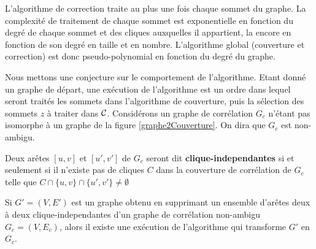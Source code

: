 L'algorithme de correction traite au plus une fois chaque sommet du graphe.
La complexit\'e de traitement de chaque sommet est exponentielle en fonction du degr\'e de chaque sommet et des cliques auxquelles il appartient, la encore en fonction  de son degr\'e en taille et en nombre.
L'algorithme global (couverture et correction) est donc pseudo-polynomial en fonction du degr\'e du graphe.
\newline

Nous mettons une conjecture sur le comportement de l'algorithme.
Etant donn\'e un graphe de d\'epart, une ex\'ecution de l'algorithme est un ordre dans lequel seront trait\'es les sommets dans l'algorithme de couverture, puis
la s\'election des sommets $z$ \`a traiter dans  $\cal C$.
\newline
Consid\'erons un graphe de corr\'elation $G_c$ n'\'etant pas isomorphe \`a un graphe de la figure \ref{graphe2Couverture}. On dira que $G_c$ est non-ambigu.

Deux ar\^etes $[u,v]$ et $[u',v']$ de $G_c$ seront dit {\bf clique-independantes} si et seulement si il n'existe pas de cliques $C$ dans la couverture de corr\'elation  de $G_c$ telle que 
$C \cap \{u,v\} \cap \{u',v'\} \ne \emptyset$

\begin{conjecture}
Si $G'=(V, E')$ est un graphe obtenu en supprimant un ensemble d'ar\^etes deux \`a deux clique-independantes d'un graphe de corr\'elation non-ambigu $G_c = (V,E_c)$, alors il existe une ex\'ecution de l'algorithme qui transforme $G'$ en $G_c$.
\end{conjecture}
